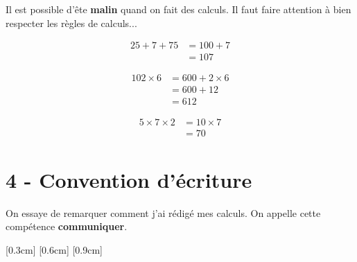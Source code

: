 \documentclass[11pt]{article}
\begin{document}
Il est possible d'ête \textbf{malin} quand on fait des calculs. Il faut faire attention à bien respecter les règles de calculs...

\begin{minipage}[t]{0.33\textwidth}
\begin{align*}
25 + 7 + 75 &= 100 + 7  \\
            &= 107
\end{align*}

\end{minipage}
\begin{minipage}[t]{0.33\textwidth}

\begin{align*}
102 \times 6 &= 600 + 2 \times 6 \\
             &= 600 + 12 \\
             &= 612
\end{align*}

\end{minipage}
\begin{minipage}[t]{0.33\textwidth}

\begin{align*}
5 \times 7 \times 2 &= 10 \times 7 \\
                    &= 70
\end{align*}
\end{minipage}

\section*{4 - Convention d'écriture}

On essaye de remarquer comment j'ai rédigé mes calculs. On appelle cette compétence \textbf{communiquer}.

\begin{center}\reversemarginpar\marginnote{$\Box \Box$}
\reversemarginpar\marginnote{$\Box \Box$}[0.3cm]
\reversemarginpar\marginnote{$\Box \Box$}[0.6cm]
\reversemarginpar\marginnote{$\Box \Box$}[0.9cm]
\end{center}
\end{document}
